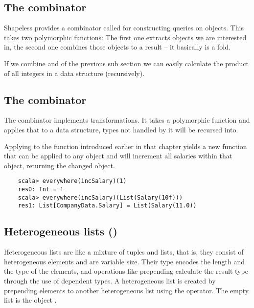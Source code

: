 \subsection{The  combinator}
Shapeless provides a combinator called  for constructing
queries on objects. This takes two polymorphic functions: The first one
extracts objects we are interested in, the second one combines those objects
to a result -- it basically is a fold.

\begin{example}
  If we combine  and  of the previous sub section we can
  easily calculate the product of all integers in a data structure (recursively).
  
\end{example}

\subsection{The  combinator}
The  combinator implements transformations. It takes a
polymorphic function and applies that to a data structure, types
not handled by it will be recursed into.

\begin{example}
  Applying  to the function  introduced earlier
  in that chapter yields a new function that can be applied to any object
  and will increment all salaries within that object, returning the changed
  object.

  \begin{lstlisting}
    scala> everywhere(incSalary)(1)
    res0: Int = 1
    scala> everywhere(incSalary)(List(Salary(10f)))
    res1: List[CompanyData.Salary] = List(Salary(11.0))
  \end{lstlisting}
\end{example}

\subsection{Heterogeneous lists ()}
Heterogeneous lists are like a mixture of tuples and lists, that is, they
consist of heterogeneous elements and are variable size. Their type encodes
the length and the type of the elements, and operations like prepending calculate
the result type through the use of dependent types.
A heterogeneous list is created by prepending elements to another heterogeneous
list using the \cd{::} operator. The empty list is the object .

